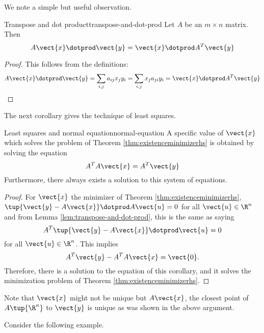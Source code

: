 We note a simple but useful observation.

\begin{lemma}{Transpose and dot product}{transpose-and-dot-prod}
Let $A$ be an $m\times n$ matrix. Then 
\begin{equation*}
A\vect{x} \dotprod \vect{y} = \vect{x}\dotprod A^T\vect{y} 
\end{equation*}
\end{lemma}

\begin{proof}
This follows from the definitions:
\[ A\vect{x} \dotprod \vect{y}=\sum_{i,j}a_{ij}x_{j} y_{i}
=\sum_{i,j}x_{j} a_{ji} y_{i}= \vect{x} \dotprod A^T\vect{y}
\] \end{proof}

The next corollary gives the technique of least squares.

\begin{corollary}{Least squares and normal equation}{normal-equation}
A specific value of $\vect{x}$ which solves the problem of Theorem 
\ref{thm:existenceminimizerhs} is obtained by solving the equation
\begin{equation*}
A^TA\vect{x}=A^T\vect{y}
\end{equation*}
Furthermore, there always exists a solution to this system of equations.
\end{corollary}

\begin{proof} 
For $\vect{x}$ the minimizer of Theorem \ref{thm:existenceminimizerhs}, $\tup{
\vect{y}-A\vect{x}} \dotprod A \vect{u} =0$ for all $\vect{u} \in \R^{n}$ and from
Lemma \ref{lem:transpose-and-dot-prod}, this is the same as saying
\begin{equation*}
A^T\tup{\vect{y}-A\vect{x}} \dotprod \vect{u}=0
\end{equation*}
for all $\vect{u} \in \R^{n}$. This implies 
\begin{equation*}
A^T\vect{y}-A^TA\vect{x}=\vect{0}.
\end{equation*}
Therefore, there is a solution to the equation of this corollary, and it
solves the minimization problem of Theorem \ref{thm:existenceminimizerhs}.
\end{proof}

Note that $\vect{x}$ might not be unique but $A\vect{x}$, the closest
point of $A\tup{\R^{n}}$ to $\vect{y}$ is unique as was shown in the
above argument. 

Consider the following example. 

